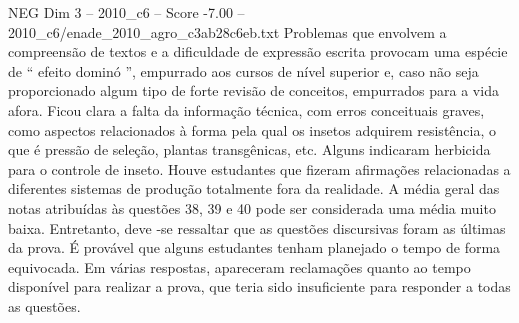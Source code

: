 \begin{textsample}{NEG Dim 3 – 2010\_c6 – Score -7.00 – 2010\_c6/enade\_2010\_agro\_c3ab28c6eb.txt}
Problemas que envolvem a compreensão de textos e a dificuldade de expressão escrita provocam uma espécie de “ efeito dominó ”, empurrado aos cursos de nível superior e, caso não seja proporcionado algum tipo de forte revisão de conceitos, empurrados para a vida afora.
Ficou clara a falta da informação técnica, com erros conceituais graves, como aspectos relacionados à forma pela qual os insetos adquirem resistência, o que é pressão de seleção, plantas transgênicas, etc.
Alguns indicaram herbicida para o controle de inseto.
Houve estudantes que fizeram afirmações relacionadas a diferentes sistemas de produção totalmente fora da realidade.
A média geral das notas atribuídas às questões 38, 39 e 40 pode ser considerada uma média muito baixa.
Entretanto, deve -se ressaltar que as questões discursivas foram as últimas da prova.
É provável que alguns estudantes tenham planejado o tempo de forma equivocada.
Em várias respostas, apareceram reclamações quanto ao tempo disponível para realizar a prova, que teria sido insuficiente para responder a todas as questões.

\end{textsample}
